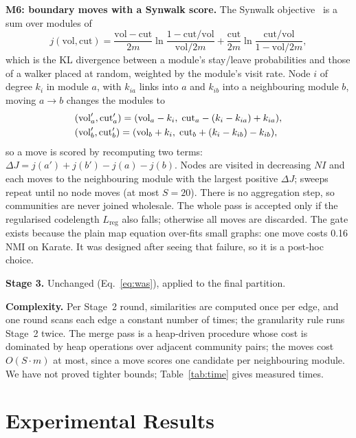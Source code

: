 \documentclass[conference]{IEEEtran}
\begin{document}
\textbf{M6: boundary moves with a Synwalk score.} The Synwalk objective~\cite{toth2022} is a sum over modules of
\begin{equation}
j(\mathrm{vol},\mathrm{cut})=\frac{\mathrm{vol}-\mathrm{cut}}{2m}\ln\frac{1-\mathrm{cut}/\mathrm{vol}}{\mathrm{vol}/2m}+\frac{\mathrm{cut}}{2m}\ln\frac{\mathrm{cut}/\mathrm{vol}}{1-\mathrm{vol}/2m},\label{eq:synwalk}
\end{equation}
which is the KL divergence between a module's stay/leave probabilities and those of a walker placed at random, weighted by the module's visit rate. Node $i$ of degree $k_i$ in module $a$, with $k_{ia}$ links into $a$ and $k_{ib}$ into a neighbouring module $b$, moving $a\to b$ changes the modules to
\begin{align}
&(\mathrm{vol}_a',\mathrm{cut}_a')=(\mathrm{vol}_a-k_i,\;\mathrm{cut}_a-(k_i-k_{ia})+k_{ia}),\notag\\
&(\mathrm{vol}_b',\mathrm{cut}_b')=(\mathrm{vol}_b+k_i,\;\mathrm{cut}_b+(k_i-k_{ib})-k_{ib}),\label{eq:move}
\end{align}
so a move is scored by recomputing two terms: $\Delta J=j(a')+j(b')-j(a)-j(b)$. Nodes are visited in decreasing $NI$ and each moves to the neighbouring module with the largest positive $\Delta J$; sweeps repeat until no node moves (at most $S=20$). There is no aggregation step, so communities are never joined wholesale. The whole pass is accepted only if the regularised codelength $L_{\mathrm{reg}}$ also falls; otherwise all moves are discarded. The gate exists because the plain map equation over-fits small graphs: one move costs 0.16 NMI on Karate. It was designed after seeing that failure, so it is a post-hoc choice.

\textbf{Stage 3.} Unchanged (Eq.~\eqref{eq:was}), applied to the final partition.

\textbf{Complexity.} Per Stage~2 round, similarities are computed once per edge, and one round scans each edge a constant number of times; the granularity rule runs Stage~2 twice. The merge pass is a heap-driven procedure whose cost is dominated by heap operations over adjacent community pairs; the moves cost $O(S\cdot m)$ at most, since a move scores one candidate per neighbouring module. We have not proved tighter bounds; Table~\ref{tab:time} gives measured times.



\section{Experimental Results}\label{sec:results}
\end{document}
